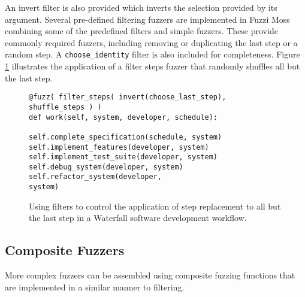 \documentclass{sig-alternate}
\begin{document}
 An invert filter is also provided which inverts the selection provided by its argument. Several pre-defined filtering
 fuzzers are implemented in Fuzzi Moss combining some of the predefined filters and simple fuzzers.  These provide
 commonly required fuzzers, including removing or duplicating the last step or a random step. A
 \lstinline!choose_identity! filter is also included for completeness.  Figure \ref{fig:filter} illustrates the
 application of a filter steps fuzzer that randomly shuffles all but the last step.

\begin{figure}
  \centering

\begin{lstlisting}
@fuzz( filter_steps( invert(choose_last_step), shuffle_steps ) )
def work(self, system, developer, schedule):

self.complete_specification(schedule, system) self.implement_features(developer, system)
self.implement_test_suite(developer, system) self.debug_system(developer, system) self.refactor_system(developer,
system)

\end{lstlisting}

  \caption{Using filters to control the application of step replacement to all but the last step in a Waterfall software
    development workflow.}
  \label{fig:filter}
\end{figure}


\subsection{Composite Fuzzers}


More complex fuzzers can be assembled using composite fuzzing functions that are implemented in a similar manner to
filtering.
\end{document}
